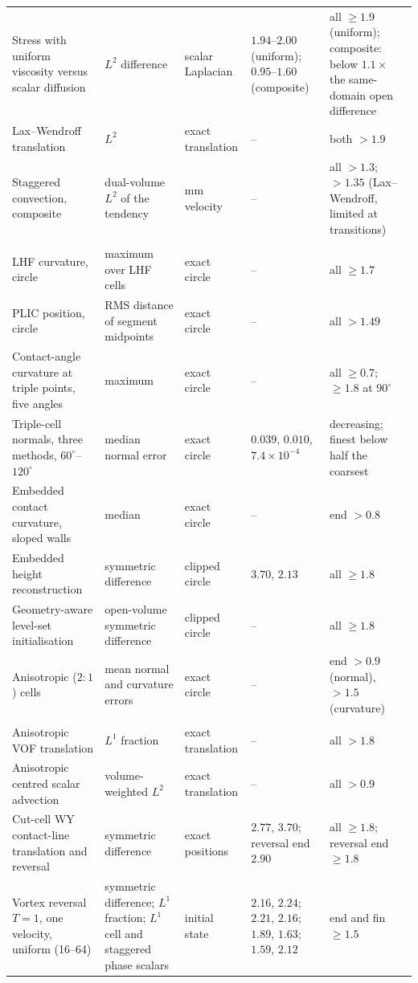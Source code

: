 {\begin{longtable}{@{}>{\raggedright}p{2.35cm}>{\raggedright}p{2.85cm}>{\raggedright}p{1.85cm}>{\raggedright}p{2.45cm}>{\raggedright\arraybackslash}p{2.6cm}@{}}
  Stress with uniform viscosity versus scalar diffusion & $L^2$ difference & scalar Laplacian & $1.94$--$2.00$ (uniform); $0.95$--$1.60$ (composite) & all $\ge1.9$ (uniform); composite: below $1.1\times$ the same-domain open difference\\
  Lax--Wendroff translation & $L^2$ & exact translation & -- & both $>1.9$\\
  Staggered convection, composite & dual-volume $L^2$ of the tendency & mm velocity & -- & all $>1.3$; $>1.35$ (Lax--Wendroff, limited at transitions)\\
  \multicolumn{5}{@{}l}{\emph{Interface}}\\
  LHF curvature, circle & maximum over LHF cells & exact circle & -- & all $\ge1.7$\\
  PLIC position, circle & RMS distance of segment midpoints & exact circle & -- & all $>1.49$\\
  Contact-angle curvature at triple points, five angles & maximum & exact circle & -- & all $\ge0.7$; $\ge1.8$ at $90^\circ$\\
  Triple-cell normals, three methods, $60^\circ$--$120^\circ$ & median normal error & exact circle & $0.039$, $0.010$, $7.4\times10^{-4}$ & decreasing; finest below half the coarsest\\
  Embedded contact curvature, sloped walls & median & exact circle & -- & end $>0.8$\\
  Embedded height reconstruction & symmetric difference & clipped circle & $3.70$, $2.13$ & all $\ge1.8$\\
  Geometry-aware level-set initialisation & open-volume symmetric difference & clipped circle & -- & all $\ge1.8$\\
  Anisotropic ($2{:}1$) cells & mean normal and curvature errors & exact circle & -- & end $>0.9$ (normal), $>1.5$ (curvature)\\
  \multicolumn{5}{@{}l}{\emph{Transport}}\\
  Anisotropic VOF translation & $L^1$ fraction & exact translation & -- & all $>1.8$\\
  Anisotropic centred scalar advection & volume-weighted $L^2$ & exact translation & -- & all $>0.9$\\
  Cut-cell WY contact-line translation and reversal & symmetric difference & exact positions & $2.77$, $3.70$; reversal end $2.90$ & all $\ge1.8$; reversal end $\ge1.8$\\
  Vortex reversal $T=1$, one velocity, uniform (16--64) & symmetric difference; $L^1$ fraction; $L^1$ cell and staggered phase scalars & initial state & $2.16$, $2.24$; $2.21$, $2.16$; $1.89$, $1.63$; $1.59$, $2.12$ & end and fin $\ge1.5$\\

\end{longtable}}
